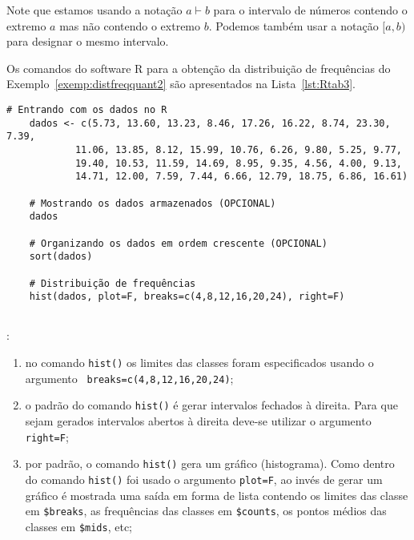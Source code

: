 \documentclass[11pt,fleqn]{book} %
\begin{document}
Note que estamos usando a notação $a \vdash b$ para o intervalo de números contendo o extremo $a$ mas não contendo o extremo $b$. Podemos também usar a notação  $[a, b)$  para designar o mesmo intervalo. 

Os comandos do software R para a obtenção da distribuição de frequências do Exemplo~\ref{exemp:distfreqquant2} são apresentados na Lista~\ref{lst:Rtab3}.


\begin{scriptsize}
	\estiloR
	\begin{lstlisting}[caption={Comandos do software R}, label=lst:Rtab3]
	# Entrando com os dados no R
	dados <- c(5.73, 13.60, 13.23, 8.46, 17.26, 16.22, 8.74, 23.30, 7.39,
			11.06, 13.85, 8.12, 15.99, 10.76, 6.26, 9.80, 5.25, 9.77,
			19.40, 10.53, 11.59, 14.69, 8.95, 9.35, 4.56, 4.00, 9.13,
			14.71, 12.00, 7.59, 7.44, 6.66, 12.79, 18.75, 6.86, 16.61)
	
	# Mostrando os dados armazenados (OPCIONAL)
	dados
	
	# Organizando os dados em ordem crescente (OPCIONAL)
	sort(dados)
	
	# Distribuição de frequências
	hist(dados, plot=F, breaks=c(4,8,12,16,20,24), right=F)
	
	\end{lstlisting}
\end{scriptsize}

: 

\begin{enumerate}[label=\alph*)]

\item no comando \texttt{hist()} os limites das classes foram especificados usando o argumento \texttt{ breaks=c(4,8,12,16,20,24)};

\item o padrão do comando \texttt{hist()} é gerar intervalos fechados à direita. Para que sejam gerados intervalos abertos à direita deve-se utilizar o argumento \texttt{right=F};

\item por padrão, o comando \texttt{hist()} gera um gráfico (histograma). Como dentro do comando \texttt{hist()} foi usado o argumento \texttt{plot=F}, ao invés de gerar um gráfico é mostrada uma saída em forma de lista contendo os limites das classe em \texttt{\$breaks}, as frequências das classes em \texttt{\$counts}, os pontos médios das classes em \texttt{\$mids}, etc; \\

\end{enumerate}
 
\end{document}
